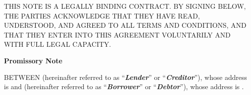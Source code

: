 
\begin{sloppypar}
THIS NOTE IS A LEGALLY BINDING CONTRACT. BY SIGNING BELOW, THE PARTIES ACKNOWLEDGE THAT THEY HAVE READ, UNDERSTOOD, AND AGREED TO ALL TERMS AND CONDITIONS, AND THAT THEY ENTER INTO THIS AGREEMENT VOLUNTARILY AND WITH FULL LEGAL CAPACITY.
\end{sloppypar}

\begin{center}

\textbf{Promissory Note}

\end{center}

\begin{sloppypar}
BETWEEN \LenderName{} (hereinafter referred to as “\textbf{\textit{Lender}}” or “\textbf{\textit{Creditor}}”), whose address is \LenderAddress{} and \BorrowerName{} (hereinafter referred to as  “\textbf{\textit{Borrower}}” or “\textbf{\textit{Debtor}}”), whose address is \BorrowerAddress{}.
\end{sloppypar}

